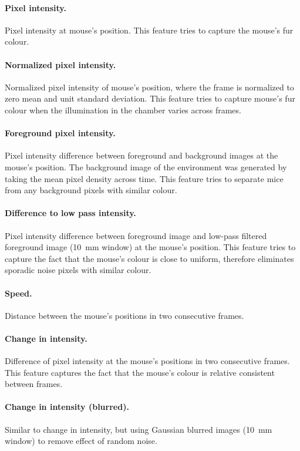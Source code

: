 \paragraph{Pixel intensity.} Pixel intensity at mouse's position. This feature tries to capture the mouse's fur colour.

\paragraph{Normalized pixel intensity.} Normalized pixel intensity of mouse's position, where the frame is normalized to zero mean and unit standard deviation. This feature tries to capture mouse's fur colour when the illumination in the chamber varies across frames.

\paragraph{Foreground pixel intensity.} Pixel intensity difference between foreground and background images at the mouse's position. The background image of the environment was generated by taking the mean pixel density across time. This feature tries to separate mice from any background pixels with similar colour.

\paragraph{Difference to low pass intensity.} Pixel intensity difference between foreground image and low-pass filtered foreground image (\SI{10}{\mm} window) at the mouse's position. This feature tries to capture the fact that the mouse's colour is close to uniform, therefore eliminates sporadic noise pixels with similar colour.

\paragraph{Speed.} Distance between the mouse's positions in two consecutive frames. 

\paragraph{Change in intensity.} Difference of pixel intensity at the mouse's positions in two consecutive frames. This feature captures the fact that the mouse's colour is relative consistent between frames.

\paragraph{Change in intensity (blurred).} Similar to change in intensity, but using Gaussian blurred images (\SI{10}{\mm} window) to remove effect of random noise.

